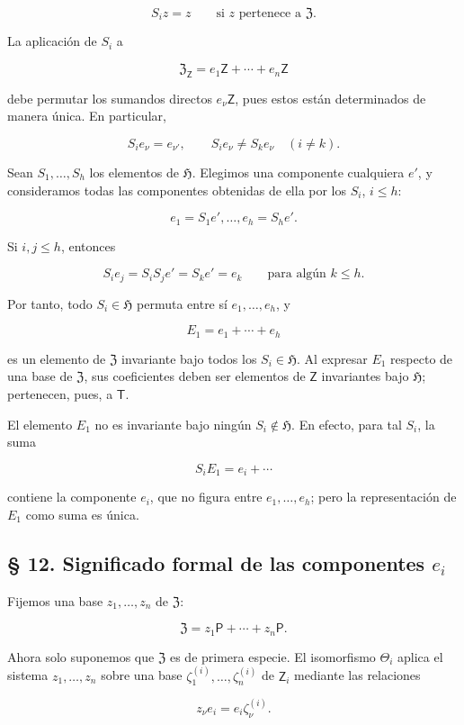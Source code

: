 \[
S_i z=z\qquad\text{si }z\text{ pertenece a }\mathfrak Z.
\]

La aplicación de $S_i$ a

\[
\mathfrak Z_{\mathsf Z}=e_1\mathsf Z+\cdots+e_n\mathsf Z
\]

debe permutar los sumandos directos $e_\nu\mathsf Z$, pues estos están determinados de manera única. En particular,

\[
S_ie_\nu=e_{\nu'},\qquad S_ie_\nu\ne S_ke_\nu\quad(i\ne k).
\]

Sean $S_1,\ldots,S_h$ los elementos de $\mathfrak H$. Elegimos una componente cualquiera $e'$, y consideramos todas las componentes obtenidas de ella por los $S_i$, $i\leq h$:

\[
e_1=S_1e',\ldots,e_h=S_he'.
\]

Si $i,j\leq h$, entonces

\[
S_ie_j=S_iS_je'=S_ke'=e_k\qquad\text{para algún }k\leq h.
\]

Por tanto, todo $S_i\in\mathfrak H$ permuta entre sí $e_1,\ldots,e_h$, y

\[
E_1=e_1+\cdots+e_h
\]

es un elemento de $\mathfrak Z$ invariante bajo todos los $S_i\in\mathfrak H$. Al expresar $E_1$ respecto de una base de $\mathfrak Z$, sus coeficientes deben ser elementos de $\mathsf Z$ invariantes bajo $\mathfrak H$; pertenecen, pues, a $\mathsf T$.

El elemento $E_1$ no es invariante bajo ningún $S_i\notin\mathfrak H$. En efecto, para tal $S_i$, la suma

\[
S_iE_1=e_i+\cdots
\]

contiene la componente $e_i$, que no figura entre $e_1,\ldots,e_h$; pero la representación de $E_1$ como suma es única.

\subsection*{§ 12. Significado formal de las componentes $e_i$}

Fijemos una base $z_1,\ldots,z_n$ de $\mathfrak Z$:

\[
\mathfrak Z=z_1\mathsf P+\cdots+z_n\mathsf P.
\]

Ahora solo suponemos que $\mathfrak Z$ es de primera especie. El isomorfismo $\Theta_i$ aplica el sistema $z_1,\ldots,z_n$ sobre una base $\zeta_1^{(i)},\ldots,\zeta_n^{(i)}$ de $\mathsf Z_i$ mediante las relaciones

\[
z_\nu e_i=e_i\zeta_\nu^{(i)}.
\]

